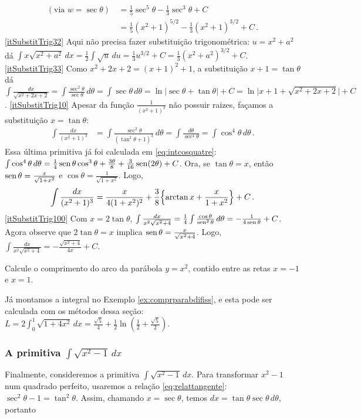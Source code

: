 \begin{exo}
\begin{sol}
\begin{align*}
(\text{via }w=\sec\theta)\,
&=\tfrac15\sec^5\theta-\tfrac13\sec^3\theta+C\\
&=\tfrac15(x^2+1)^{5/2}-\tfrac13(x^2+1)^{3/2}+C\,.
\end{align*}
\eqref{itSubstitTrig32} Aqui não precisa fazer substituição trigonométrica:
$u=x^2+a^2$ dá $\int
x\sqrt{x^2+a^2}\,dx=\tfrac12\int\sqrt{u}\,du=\tfrac13u^{3/2}+C=
\tfrac13(x^2+a^2)^{3/2}+C$.
\eqref{itSubstitTrig33} Como $x^2+2x+2=(x+1)^2+1$, a substituição
$x+1=\tan\theta$ dá 
$\int
\frac{dx}{\sqrt{x^2+2x+2}}=\int\frac{\sec^2\theta}{\sec\theta}\,
d\theta=\int\sec\theta\,d\theta=\ln|\sec\theta+\tan\theta|+C=\ln\bigl|x+1+\sqrt{
x^2+2x+2}\bigr|+C$.
\eqref{itSubstitTrig10} Apesar da função $\frac{1}{(x^2+1)^3}$ não possuir
raizes, façamos a substituição $x=\tan\theta$:
\begin{align*}
\int\frac{dx}{(x^2+1)^3}&=\int\frac{\sec^2\theta}{(\tan^2\theta+1)^3}\,
d\theta=\int\frac{d\theta}{\sec^4\theta}=\int\cos^4\theta\,d\theta\,.
\end{align*}
Essa última primitiva já foi calculada em \eqref{eq:intcosquatre}:
$\int \cos^4\theta\,d \theta=\tfrac14\operatorname{sen}
\theta\cos^3\theta+\tfrac{3\theta}{8}+\tfrac{3}{16}
\operatorname{sen}(2\theta)+C$. Ora, se $\tan\theta=x$, então
$\operatorname{sen}\theta=\frac{x}{\sqrt{1+x^2}}$ e $\cos\theta=\frac{1}{\sqrt{1+x^2}}$.
Logo,
$$
\int\frac{dx}{(x^2+1)^3}=\frac{x}{4(1+x^2)^2}+\frac38\Bigl\{\arctan
x+\frac{x}{1+x^2}\Bigr\}+C\,.
$$
\eqref{itSubstitTrig100} Com $x=2\tan \theta$, 
$\int\frac{dx}{x^2\sqrt{x^2+4}}=\tfrac14\int
\frac{\cos\theta}{\operatorname{sen}^2\theta}\,d\theta=-\frac{1}{4\operatorname{sen}\theta}+C$.
Agora observe que $2\tan \theta=x$ implica $\operatorname{sen}\theta=\frac{x}{\sqrt{x^2+4}}$.
Logo,
$\int\frac{dx}{x^2\sqrt{x^2+4}}=-\frac{\sqrt{x^2+4}}{4x}+C$.
\end{sol}
\end{exo}

\begin{exo}\label{exo:comprparabola}
Calcule o comprimento do arco da parábola $y=x^2$, contido 
entre as retas $x=-1$ e  $x=1$.
\begin{sol}
Já montamos a integral no Exemplo \ref{ex:comprparabdifiss}, e esta pode ser
calculada com os métodos dessa seção: 
$L=2\int_0^1\sqrt{1+4x^2}\,dx=\frac{\sqrt{5}}{4}+\frac12\ln(\frac12+\frac{\sqrt{5}}{2})$.
\end{sol}
\end{exo}

\subsubsection{A primitiva $\int \sqrt{x^2-1}\,dx$}
Finalmente, consideremos a primitiva $\int \sqrt{x^2-1}\,dx$. Para transformar
$x^2-1$ num quadrado perfeito, usaremos a relação \eqref{eq:relattangente}:
$\sec^2\theta-1=\tan^2\theta$. Assim, chamando $x=\sec\theta$, temos
$dx=\tan\theta\sec\theta\,d\theta$, portanto

